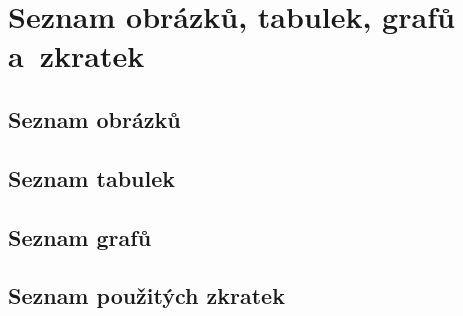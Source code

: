 \chapter{Seznam obrázků, tabulek, grafů a~zkratek}

\section{Seznam obrázků}
\CZUlistoffigures

\section{Seznam tabulek}
\CZUlistoftables

\section{Seznam grafů}
\CZUlistofgrafs

\section{Seznam použitých zkratek}
\glsaddall
\printnoidxglossary[type=acronym, title={}, style=czuabbr, sort=letter]
